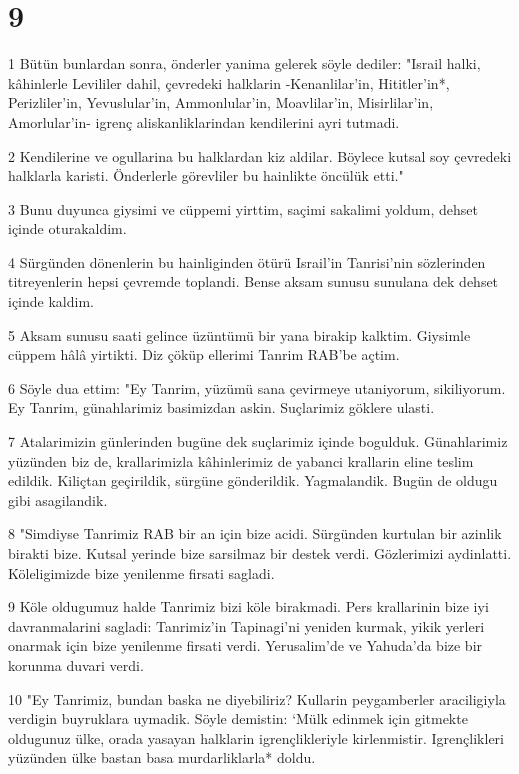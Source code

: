 \chapter{9}

\par 1 Bütün bunlardan sonra, önderler yanima gelerek söyle dediler: "Israil halki, kâhinlerle Levililer dahil, çevredeki halklarin -Kenanlilar'in, Hititler'in*, Perizliler'in, Yevuslular'in, Ammonlular'in, Moavlilar'in, Misirlilar'in, Amorlular'in- igrenç aliskanliklarindan kendilerini ayri tutmadi.
\par 2 Kendilerine ve ogullarina bu halklardan kiz aldilar. Böylece kutsal soy çevredeki halklarla karisti. Önderlerle görevliler bu hainlikte öncülük etti."
\par 3 Bunu duyunca giysimi ve cüppemi yirttim, saçimi sakalimi yoldum, dehset içinde oturakaldim.
\par 4 Sürgünden dönenlerin bu hainliginden ötürü Israil'in Tanrisi'nin sözlerinden titreyenlerin hepsi çevremde toplandi. Bense aksam sunusu sunulana dek dehset içinde kaldim.
\par 5 Aksam sunusu saati gelince üzüntümü bir yana birakip kalktim. Giysimle cüppem hâlâ yirtikti. Diz çöküp ellerimi Tanrim RAB'be açtim.
\par 6 Söyle dua ettim: "Ey Tanrim, yüzümü sana çevirmeye utaniyorum, sikiliyorum. Ey Tanrim, günahlarimiz basimizdan askin. Suçlarimiz göklere ulasti.
\par 7 Atalarimizin günlerinden bugüne dek suçlarimiz içinde bogulduk. Günahlarimiz yüzünden biz de, krallarimizla kâhinlerimiz de yabanci krallarin eline teslim edildik. Kiliçtan geçirildik, sürgüne gönderildik. Yagmalandik. Bugün de oldugu gibi asagilandik.
\par 8 "Simdiyse Tanrimiz RAB bir an için bize acidi. Sürgünden kurtulan bir azinlik birakti bize. Kutsal yerinde bize sarsilmaz bir destek verdi. Gözlerimizi aydinlatti. Köleligimizde bize yenilenme firsati sagladi.
\par 9 Köle oldugumuz halde Tanrimiz bizi köle birakmadi. Pers krallarinin bize iyi davranmalarini sagladi: Tanrimiz'in Tapinagi'ni yeniden kurmak, yikik yerleri onarmak için bize yenilenme firsati verdi. Yerusalim'de ve Yahuda'da bize bir korunma duvari verdi.
\par 10 "Ey Tanrimiz, bundan baska ne diyebiliriz? Kullarin peygamberler araciligiyla verdigin buyruklara uymadik. Söyle demistin: `Mülk edinmek için gitmekte oldugunuz ülke, orada yasayan halklarin igrençlikleriyle kirlenmistir. Igrençlikleri yüzünden ülke bastan basa murdarliklarla* doldu.
